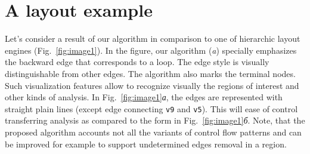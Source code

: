 \documentclass[conference]{IEEEtran}
\begin{document}


\section{A layout example}

Let's consider a result of our algorithm in comparison to one of hierarchic layout engines (Fig.~\ref{fig:image1}).  In the figure, our algorithm (\emph{a}) specially emphasizes the backward edge that corresponds to a loop.  The edge style is visually distinguishable from other edges.  The algorithm also marks the terminal nodes.  Such visualization features allow to recognize visually the regions of interest and other kinds of analysis.  In Fig.~\ref{fig:image1}\emph{а}, the edges are represented with straight plain lines (except edge connecting \texttt{v9} and \texttt{v5}).  This will ease of control transferring analysis as compared to the form in Fig.~\ref{fig:image1}\emph{б}. Note, that the proposed algorithm accounts not all the variants of control flow patterns and can be improved for example to support undetermined edges removal in a region.
\end{document}
